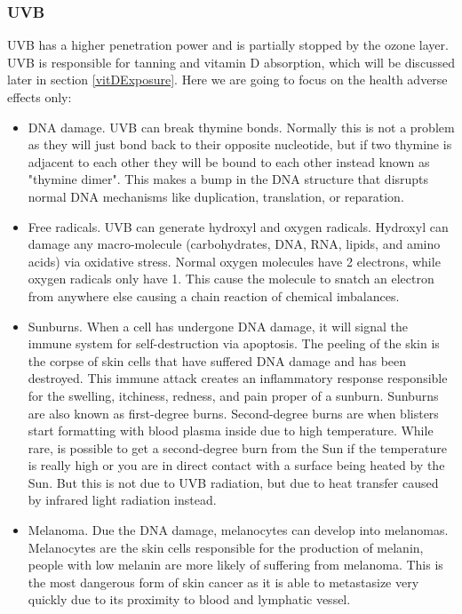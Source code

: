 \subsubsection{UVB}

UVB has a higher penetration power and is partially stopped by the ozone layer. UVB is responsible for tanning and vitamin D absorption, which will be discussed later in section \ref{vitDExposure}. Here we are going to focus on the health adverse effects only:\vspace{3 mm}

\begin{itemize}

\item
DNA damage. UVB can break thymine bonds. Normally this is not a problem as they will just bond back to their opposite nucleotide, but if two thymine is adjacent to each other they will be bound to each other instead known as "thymine dimer". This makes a bump in the DNA structure that disrupts normal DNA mechanisms like duplication, translation, or reparation. 

\item
Free radicals. UVB can generate hydroxyl and oxygen radicals. Hydroxyl can damage any macro-molecule (carbohydrates, DNA, RNA, lipids, and amino acids) via oxidative stress. Normal oxygen molecules have 2 electrons, while oxygen radicals only have 1. This cause the molecule to snatch an electron from anywhere else causing a chain reaction of chemical imbalances.

\item
Sunburns. When a cell has undergone DNA damage, it will signal the immune system for self-destruction via apoptosis. The peeling of the skin is the corpse of skin cells that have suffered DNA damage and  has been destroyed. This immune attack creates an inflammatory response responsible for the swelling, itchiness, redness, and pain proper of a sunburn. Sunburns are also known as first-degree burns. Second-degree burns are when blisters start formatting with blood plasma inside due to high temperature. While rare, is possible to get a second-degree burn from the Sun if the temperature is really high or you are in direct contact with a surface being heated by the Sun. But this is not due to UVB radiation, but due to heat transfer caused by infrared light radiation instead.

\item
Melanoma. Due the DNA damage, melanocytes can develop into melanomas. Melanocytes are the skin cells responsible for the production of melanin, people with low melanin are more likely of suffering from melanoma. This is the most dangerous form of skin cancer as it is able to metastasize very quickly due to its proximity to blood and lymphatic vessel.


\end{itemize}
